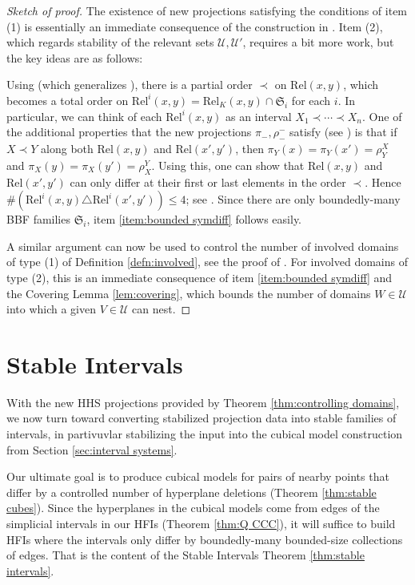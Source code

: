 \documentclass{amsart}
\theoremstyle{definition}
\theoremstyle{remark}
\theoremstyle{definition}
\newcommand{\calU}{\mathcal{U}}
\newcommand{\Rel}{\mathrm{Rel}}
\begin{document}
\begin{proof}[Sketch of proof]
The existence of new projections satisfying the conditions of item (1) is essentially an immediate consequence of the construction in \cite[Theorem 4.1]{BBFS}.  Item (2), which regards stability of the relevant sets $\calU, \calU'$, requires a bit more work, but the key ideas are as follows:

Using \cite[Proposition 2.8]{HHS_II} (which generalizes \cite{CLM12, BKMM:qirigid, BBF}), there is a partial order $\prec$ on $\Rel(x,y)$, which becomes a total order on $\Rel^i(x,y) = \Rel_K(x,y) \cap \mathfrak S_i$ for each $i$.  In particular, we can think of each $\Rel^i(x,y)$ as an interval $X_1 \prec \cdots \prec X_n$.  One of the additional properties that the new projections $\pi_{-}, \rho^{-}_{-}$ satisfy (see \cite[Theorem 2.9]{DMS_bary}) is that if $X \prec Y$ along both $\Rel(x,y)$ and $\Rel(x',y')$, then $\pi_Y(x) = \pi_Y(x') = \rho^X_Y$ and $\pi_X(y) = \pi_X(y') = \rho^Y_X$.  Using this, one can show that $\Rel(x,y)$ and $\Rel(x',y')$ can only differ at their first or last elements in the order $\prec$.  Hence $\#\left(\Rel^i(x,y) \triangle \Rel^i(x',y')\right) \leq 4$; see \cite[Lemma 2.11 and Proposition 2.12]{DMS_bary}.  Since there are only boundedly-many BBF families $\mathfrak S_i$, item \eqref{item:bounded symdiff} follows easily.

A similar argument can now be used to control the number of involved domains of type (1) of Definition \ref{defn:involved}, see the proof of \cite[Proposition 2.14]{DMS_bary}.  For involved domains of type (2), this is an immediate consequence of item \eqref{item:bounded symdiff} and the Covering Lemma \ref{lem:covering}, which bounds the number of domains $W \in \calU$ into which a given $V \in \calU$ can nest.
\end{proof}





\section{Stable Intervals}\label{sec:stable intervals}

With the new HHS projections provided by Theorem \ref{thm:controlling domains}, we now turn toward converting stabilized projection data into stable families of intervals, in partivuvlar stabilizing the input into the cubical model construction from Section \ref{sec:interval systems}.


Our ultimate goal is to produce cubical models for pairs of nearby points that differ by a controlled number of hyperplane deletions (Theorem \ref{thm:stable cubes}). Since the hyperplanes in the cubical models come from edges of the simplicial intervals in our HFIs (Theorem \ref{thm:Q CCC}), it will suffice to build HFIs where the intervals only differ by boundedly-many bounded-size collections of edges.  That is the content of the Stable Intervals Theorem \ref{thm:stable intervals}. 
\end{document}
